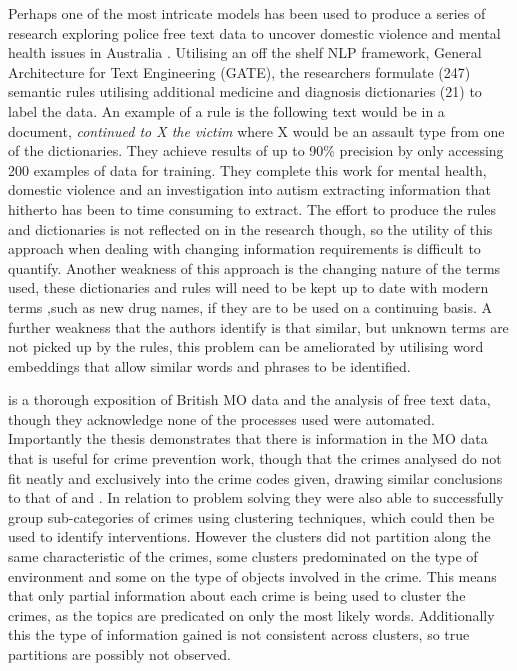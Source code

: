 Perhaps one of the most intricate models has been used to produce a series of research exploring police free text data to uncover domestic violence and mental health issues in Australia \parencite{karystianis2018automatic, karystianis2019automated, Hwang2020}. Utilising an off the shelf NLP framework, General Architecture for Text Engineering (GATE), the researchers formulate (247) semantic rules utilising additional medicine and diagnosis dictionaries (21) to label the data. An example of a rule is the following text would be in a document,  \emph{continued to X the victim} where X would be an assault type from one of the dictionaries.  They achieve results of up to 90\% precision by only accessing 200 examples of data for training.  They complete this work for mental health, domestic violence and an investigation into autism extracting information that hitherto has been to time consuming to extract. The effort to produce the rules and dictionaries is not reflected on in the research though, so the utility of this approach when dealing with changing information requirements is difficult to quantify. Another weakness of this approach is the changing nature of the terms used, these dictionaries and rules will need to be kept up to date with modern terms ,such as new drug names, if they are to be used on a continuing basis. A further weakness that the authors identify is that similar, but unknown terms are not picked up by the rules, this problem can be ameliorated by utilising word embeddings that allow similar words and phrases to be identified.


\textcite{rogerson2016utility} is a thorough exposition of British MO data and the analysis of free text data, though they acknowledge none of the processes used were automated. Importantly the thesis demonstrates that there is information in the MO data that is useful for crime prevention work, though that the crimes analysed do not fit neatly and exclusively into the crime codes given, drawing similar conclusions to that of \textcite{birks2020unsupervised} and \textcite{kuang2017crime}. In relation to problem solving they were also able to successfully group sub-categories of crimes using clustering techniques, which could then be used to identify interventions. However the clusters did not partition along the same characteristic of the crimes, some clusters predominated on the type of environment and some on the type of objects involved in the crime. This means that only partial information about each crime is being used to cluster the crimes, as the topics are predicated on only the most likely words. Additionally this the type of information gained is not consistent across clusters, so true partitions are possibly not observed.  

